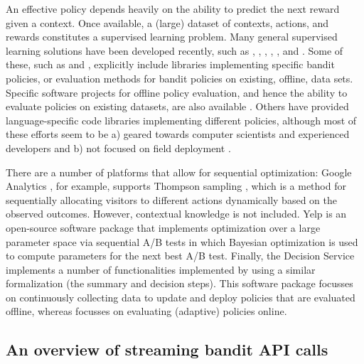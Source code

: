 \documentclass[nojss]{jss}
\begin{document}
An effective policy depends heavily on the ability to predict the next reward given a context. Once available, a (large) dataset of contexts, actions, and rewards constitutes a supervised learning problem. Many general supervised learning solutions have been developed recently, such as  \citep{seide2016cntk},  \citep{collet2016leveraging},  \citep{cui2016geeps},  \citep{meng2016mllib},  \citep{abadi2016tensorflow}, and  \citep{reagen2016minerva}. Some of these, such as  \citep{langford2011vowpal} and  \citep{hido2013jubatus}, explicitly include libraries implementing specific bandit policies, or evaluation methods for bandit policies on existing, offline, data sets. Specific software projects for offline policy evaluation, and hence the ability to evaluate policies on existing datasets, are also available \citep[see, e.g.,][]{komiyama2015optimal,timnugent,ntucllab}. Others have provided language-specific code libraries implementing different policies, although most of these efforts seem to be a) geared towards computer scientists and experienced developers and b) not focused on field deployment \citep[see][and the references therein]{CapGarKau12,bgalbraith,danisola}.

There are a number of platforms that allow for sequential optimization: Google Analytics \citep{googleanalytics}, for example, supports Thompson sampling \citep{Agrawal2011, Kaptein2014a, thompson1933likelihood}, which is a method for sequentially allocating visitors to different actions dynamically based on the observed outcomes. However, contextual knowledge is not included. Yelp  \citep{YelpMoe2014} is an open-source software package that implements optimization over a large parameter space via sequential A/B tests in which Bayesian optimization is used to compute parameters for the next best A/B test. Finally, the Decision Service \citep{agarwal2016making} implements a number of functionalities implemented by  using a similar formalization (the summary and decision steps). This software package focusses on continuously collecting data to update and deploy policies that are evaluated offline, whereas  focusses on evaluating (adaptive) policies online.

\subsection{An overview of streaming bandit API calls}
\end{document}
